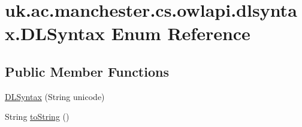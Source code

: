 \hypertarget{enumuk_1_1ac_1_1manchester_1_1cs_1_1owlapi_1_1dlsyntax_1_1_d_l_syntax}{\section{uk.\-ac.\-manchester.\-cs.\-owlapi.\-dlsyntax.\-D\-L\-Syntax Enum Reference}
\label{enumuk_1_1ac_1_1manchester_1_1cs_1_1owlapi_1_1dlsyntax_1_1_d_l_syntax}
}
\subsection*{Public Member Functions}
\begin{DoxyCompactItemize}
\item 
\hyperlink{enumuk_1_1ac_1_1manchester_1_1cs_1_1owlapi_1_1dlsyntax_1_1_d_l_syntax_a74d452af62db51d527b38988f23e1a6d}{D\-L\-Syntax} (String unicode)
\item 
String \hyperlink{enumuk_1_1ac_1_1manchester_1_1cs_1_1owlapi_1_1dlsyntax_1_1_d_l_syntax_aaa77d0b4d5122673c9e15afe20103898}{to\-String} ()
\end{DoxyCompactItemize}
